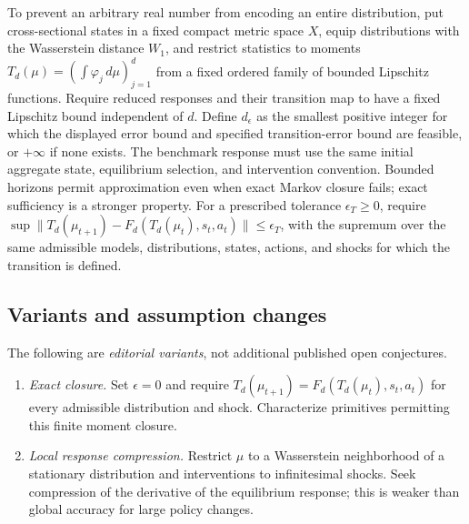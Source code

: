 \documentclass[11pt,a4paper]{article}
\begin{document}
To prevent an arbitrary real number from encoding an entire distribution, put cross-sectional states in a fixed compact metric space \(X\), equip distributions with the Wasserstein distance \(W_1\), and restrict statistics to moments \(T_d(\mu)=(\int\varphi_j\,d\mu)_{j=1}^d\) from a fixed ordered family of bounded Lipschitz functions. Require reduced responses and their transition map to have a fixed Lipschitz bound independent of \(d\). Define \(d_\epsilon\) as the smallest positive integer for which the displayed error bound and specified transition-error bound are feasible, or \(+\infty\) if none exists. The benchmark response must use the same initial aggregate state, equilibrium selection, and intervention convention. Bounded horizons permit approximation even when exact Markov closure fails; exact sufficiency is a stronger property. For a prescribed tolerance \(\epsilon_T\ge0\), require \(\sup\|T_d(\mu_{t+1})-F_d(T_d(\mu_t),s_t,a_t)\|\le\epsilon_T\), with the supremum over the same admissible models, distributions, states, actions, and shocks for which the transition is defined.
\subsection*{Variants and assumption changes}
The following are \emph{editorial variants}, not additional published open conjectures.
\begin{enumerate}
\item \emph{Exact closure.} Set \(\epsilon=0\) and require \(T_d(\mu_{t+1})=F_d(T_d(\mu_t),s_t,a_t)\) for every admissible distribution and shock. Characterize primitives permitting this finite moment closure.
\item \emph{Local response compression.} Restrict \(\mu\) to a Wasserstein neighborhood of a stationary distribution and interventions to infinitesimal shocks. Seek compression of the derivative of the equilibrium response; this is weaker than global accuracy for large policy changes.
\end{enumerate}
\end{document}
